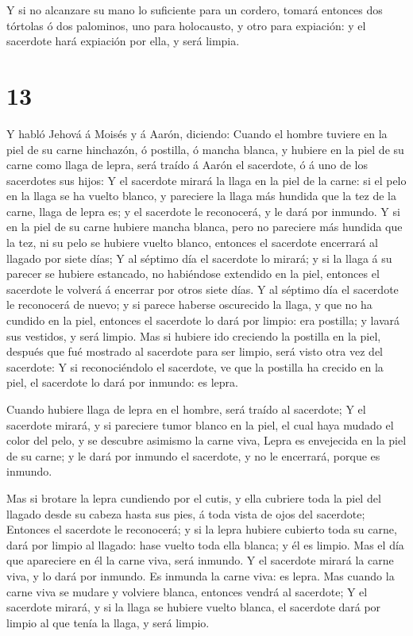  Y si no alcanzare su mano lo suficiente para un cordero,
tomará entonces dos tórtolas ó dos palominos, uno para holocausto, y
otro para expiación: y el sacerdote hará expiación por ella, y será
limpia.

\hypertarget{section-12}{%
\section{13}\label{section-12}}

 Y habló Jehová á Moisés y á Aarón, diciendo: 
Cuando el hombre tuviere en la piel de su carne hinchazón, ó postilla, ó
mancha blanca, y hubiere en la piel de su carne como llaga de lepra,
será traído á Aarón el sacerdote, ó á uno de los sacerdotes sus hijos:
 Y el sacerdote mirará la llaga en la piel de la carne: si
el pelo en la llaga se ha vuelto blanco, y pareciere la llaga más
hundida que la tez de la carne, llaga de lepra es; y el sacerdote le
reconocerá, y le dará por inmundo.  Y si en la piel de su
carne hubiere mancha blanca, pero no pareciere más hundida que la tez,
ni su pelo se hubiere vuelto blanco, entonces el sacerdote encerrará al
llagado por siete días;  Y al séptimo día el sacerdote lo
mirará; y si la llaga á su parecer se hubiere estancado, no habiéndose
extendido en la piel, entonces el sacerdote le volverá á encerrar por
otros siete días.  Y al séptimo día el sacerdote le
reconocerá de nuevo; y si parece haberse oscurecido la llaga, y que no
ha cundido en la piel, entonces el sacerdote lo dará por limpio: era
postilla; y lavará sus vestidos, y será limpio.  Mas si
hubiere ido creciendo la postilla en la piel, después que fué mostrado
al sacerdote para ser limpio, será visto otra vez del sacerdote:
 Y si reconociéndolo el sacerdote, ve que la postilla ha
crecido en la piel, el sacerdote lo dará por inmundo: es lepra.

 Cuando hubiere llaga de lepra en el hombre, será traído al
sacerdote;  Y el sacerdote mirará, y si pareciere tumor
blanco en la piel, el cual haya mudado el color del pelo, y se descubre
asimismo la carne viva,  Lepra es envejecida en la piel de
su carne; y le dará por inmundo el sacerdote, y no le encerrará, porque
es inmundo.

 Mas si brotare la lepra cundiendo por el cutis, y ella
cubriere toda la piel del llagado desde su cabeza hasta sus pies, á toda
vista de ojos del sacerdote;  Entonces el sacerdote le
reconocerá; y si la lepra hubiere cubierto toda su carne, dará por
limpio al llagado: hase vuelto toda ella blanca; y él es limpio.
 Mas el día que apareciere en él la carne viva, será
inmundo.  Y el sacerdote mirará la carne viva, y lo dará
por inmundo. Es inmunda la carne viva: es lepra.  Mas
cuando la carne viva se mudare y volviere blanca, entonces vendrá al
sacerdote;  Y el sacerdote mirará, y si la llaga se hubiere
vuelto blanca, el sacerdote dará por limpio al que tenía la llaga, y
será limpio.

